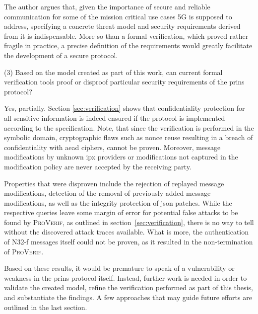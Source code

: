The author argues that, given the importance of secure and reliable communication for some of the mission critical use cases 5G is supposed to address, specifying a concrete threat model and security requirements derived from it is indispensable.
More so than a formal verification, which proved rather fragile in practice, a precise definition of the requirements would greatly facilitate the development of a secure protocol.\bigskip

\noindent
(3) Based on the model created as part of this work, can current formal verification tools proof or disproof particular security requirements of the \gls{prins} protocol?

Yes, partially.
Section \ref{sec:verification} shows that confidentiality protection for all sensitive information is indeed ensured if the protocol is implemented according to the specification.
Note, that since the verification is performed in the symbolic domain, cryptographic flaws such as nonce reuse resulting in a breach of confidentiality with \gls{aead} ciphers, cannot be proven.
Moreover, message modifications by unknown \gls{ipx} providers or modifications not captured in the modification policy are never accepted by the receiving party.

Properties that were disproven include the rejection of replayed message modifications, detection of the removal of previously added message modifications, as well as the integrity protection of \gls{json} patches.
While the respective queries leave some margin of error for potential false attacks to be found by \textsc{ProVerif}, as outlined in section~\ref{sec:verification}, there is no way to tell without the discovered attack traces available.
What is more, the authentication of N32-f messages itself could not be proven, as it resulted in the non-termination of \textsc{ProVerif}.

Based on these results, it would be premature to speak of a vulnerability or weakness in the \gls{prins} protocol itself.
Instead, further work is needed in order to validate the created model, refine the verification performed as part of this thesis, and substantiate the findings.
A few approaches that may guide future efforts are outlined in the last section.